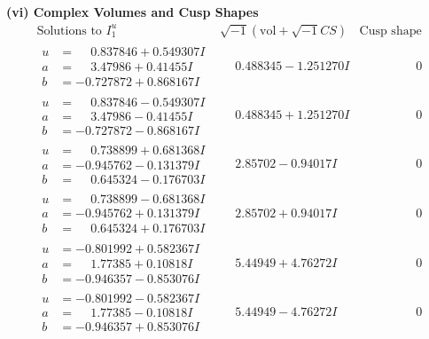 \documentclass[1p]{elsarticle_modified}
\theoremstyle{definition}
\newcommand{\I}{\sqrt{-1}}
\begin{document}
\newpage\flushleft \textbf{(vi) Complex Volumes and Cusp Shapes}
$$\begin{array}{c|c|c}  
\text{Solutions to }I^u_{1}& \I (\text{vol} + \sqrt{-1}CS) & \text{Cusp shape}\\
 \hline 
\begin{aligned}
u &= \phantom{-}0.837846 + 0.549307 I \\
a &= \phantom{-}3.47986 + 0.41455 I \\
b &= -0.727872 + 0.868167 I\end{aligned}
 & \phantom{-}0.488345 - 1.251270 I & \phantom{-0.000000 } 0 \\ \hline\begin{aligned}
u &= \phantom{-}0.837846 - 0.549307 I \\
a &= \phantom{-}3.47986 - 0.41455 I \\
b &= -0.727872 - 0.868167 I\end{aligned}
 & \phantom{-}0.488345 + 1.251270 I & \phantom{-0.000000 } 0 \\ \hline\begin{aligned}
u &= \phantom{-}0.738899 + 0.681368 I \\
a &= -0.945762 - 0.131379 I \\
b &= \phantom{-}0.645324 - 0.176703 I\end{aligned}
 & \phantom{-}2.85702 - 0.94017 I & \phantom{-0.000000 } 0 \\ \hline\begin{aligned}
u &= \phantom{-}0.738899 - 0.681368 I \\
a &= -0.945762 + 0.131379 I \\
b &= \phantom{-}0.645324 + 0.176703 I\end{aligned}
 & \phantom{-}2.85702 + 0.94017 I & \phantom{-0.000000 } 0 \\ \hline\begin{aligned}
u &= -0.801992 + 0.582367 I \\
a &= \phantom{-}1.77385 + 0.10818 I \\
b &= -0.946357 - 0.853076 I\end{aligned}
 & \phantom{-}5.44949 + 4.76272 I & \phantom{-0.000000 } 0 \\ \hline\begin{aligned}
u &= -0.801992 - 0.582367 I \\
a &= \phantom{-}1.77385 - 0.10818 I \\
b &= -0.946357 + 0.853076 I\end{aligned}
 & \phantom{-}5.44949 - 4.76272 I & \phantom{-0.000000 } 0 \\ \hline\begin{aligned}

\end{aligned}
\end{array}$$
\end{document}
